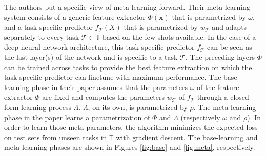 The authors put a specific view of meta-learning forward. Their meta-learning system consists of a generic feature extractor $\Phi(\bm{x})$ that is parametrized by $\omega$, and a task-specific predictor $f_\mathcal{T}(X)$ that is parametrized by $w_{\mathcal{T}}$ and adapts separately to every task $\mathcal{T} \in \mathbb{T}$ based on the few shots available. In the case of a deep neural network architecture, this task-specific predictor $f_\mathcal{T}$ can be seen as the last layer(s) of the network and is specific to a task $\mathcal{T}$. The preceding layers $\Phi$ can be trained across tasks to provide the best feature extraction on which the task-specific predictor can finetune with maximum performance. The base-learning phase in their paper assumes that the parameters $\omega$ of the feature extractor $\Phi$ are fixed and computes the parameters $w_\mathcal{T}$ of $f_\mathcal{T}$ through a closed-form learning process $\Lambda$. $\Lambda$, on its own, is parametrized by $\rho$. The meta-learning phase in the paper learns a parametrization of $\Phi$ and $\Lambda$ (respectively $\omega$ and $\rho$). In order to learn those meta-parameters, the algorithm minimizes the expected loss on test sets from unseen tasks in $\mathbb{T}$ with gradient descent. The base-learning and meta-learning phases are shown in Figures \ref{fig:base} and \ref{fig:meta}, respectively.


